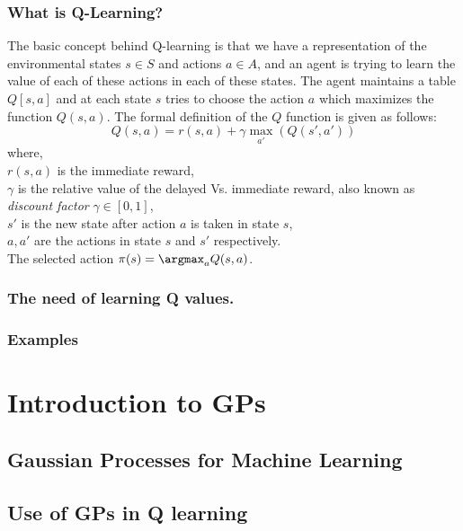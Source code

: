 \documentclass[12pt]{report}
\begin{document}
\subsubsection{What is Q-Learning?} 
The basic concept behind Q-learning is that we have a representation of the environmental states $s \in S$ and actions $a \in A$, and an agent is trying to learn the value of each of these actions in each of these states. The agent maintains a table $Q[s,a]$ and at each state $s$ tries to choose the action $a$ which maximizes the function $Q(s,a)$. The formal definition of the $Q$ function is given as follows:
\begin{equation} \label{q_function}
Q(s,a) = r(s,a) + \gamma \max_{a'}(Q(s',a'))
\end{equation}
where,\\
$r(s,a)$ is the immediate reward,\\
$\gamma$ is the relative value of the delayed Vs. immediate reward, also known as \textit{discount factor} $ \gamma \in [0,1]$,\\
$s'$ is the new state after action $a$ is taken in state $s$,\\
$a,a'$ are the actions in state $s$ and $s'$ respectively.\\
The selected action $\pi(s) = \argmax_a Q(s,a)$.


\subsubsection{The need of learning Q values.}
\subsubsection{Examples}


\section{Introduction to GPs} %
\label{introToGPs} %
\subsection{Gaussian Processes for Machine Learning}
\subsection{Use of GPs in Q learning}


\end{document}
